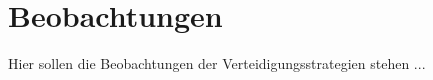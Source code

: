\section{Beobachtungen} \label{chpt:Ergebnisse_Beobachtungen}
Hier sollen die Beobachtungen der Verteidigungsstrategien stehen ...